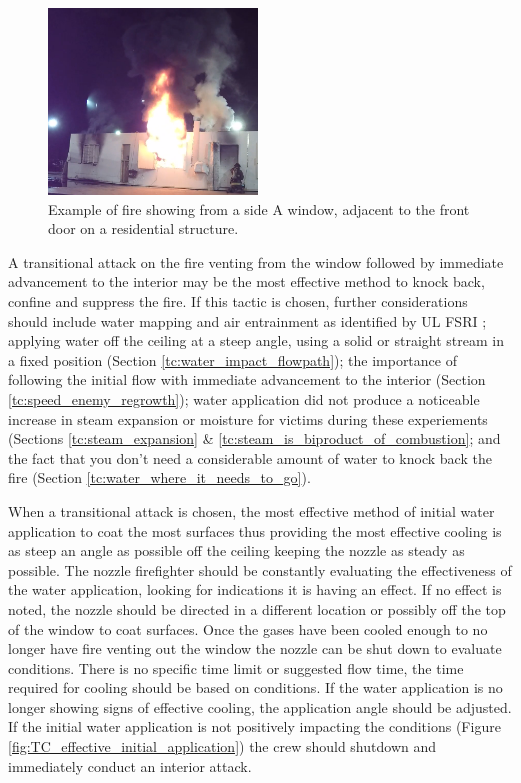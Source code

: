 \documentclass[12pt,oneside]{book}
\begin{document}
\begin{figure}[H]
\centering
\includegraphics[width=0.495\textwidth]{../0_Images/Tactical_Considerations/Transitional_Attack/SIDE_A}
\caption[Example - Fire Showing - Side A]{Example of fire showing from a side A window, adjacent to the front door on a residential structure.}
\label{fig:transitional_attack_TC_fire_showing}
\end{figure}

A transitional attack on the fire venting from the window followed by immediate advancement to the interior may be the most effective method to knock back, confine and suppress the fire. If this tactic is chosen, further considerations should include water mapping and air entrainment as identified by UL FSRI \cite{Weinchenk_watermapping} \cite{Weinchenk_airentrainment}; applying water off the ceiling at a steep angle, using a solid or straight stream in a fixed position (Section \ref{tc:water_impact_flowpath}); the importance of following the initial flow with immediate advancement to the interior (Section \ref{tc:speed_enemy_regrowth}); water application did not produce a noticeable increase in steam expansion or moisture for victims during these experiements (Sections \ref{tc:steam_expansion} \& \ref{tc:steam_is_biproduct_of_combustion}; and the fact that you don't need a considerable amount of water to knock back the fire (Section \ref{tc:water_where_it_needs_to_go}).

When a transitional attack is chosen, the most effective method of initial water application to coat the most surfaces thus providing the most effective cooling is as steep an angle as possible off the ceiling keeping the nozzle as steady as possible. The nozzle firefighter should be constantly evaluating the effectiveness of the water application, looking for indications it is having an effect. If no effect is noted, the nozzle should be directed in a different location or possibly off the top of the window to coat surfaces. Once the gases have been cooled enough to no longer have fire venting out the window the nozzle can be shut down to evaluate conditions. There is no specific time limit or suggested flow time, the time required for cooling should be based on conditions. If the water application is no longer showing signs of effective cooling, the application angle should be adjusted. If the initial water application is not positively impacting the conditions (Figure \ref{fig:TC_effective_initial_application}) the crew should shutdown and immediately conduct an interior attack.
\end{document}
